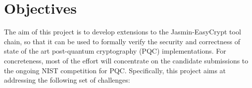 \documentclass[preprint]{iacrtrans}
\begin{document}


\section*{Objectives}

  The aim of this project is to develop extensions to the
  Jasmin-EasyCrypt tool chain, so that it can be used to formally verify
  the security and correctness of state of the art post-quantum
  cryptography (PQC) implementations. For concreteness, most of the
  effort will concentrate on the candidate submissions to the ongoing
  NIST competition for PQC. Specifically, this project aims at
  addressing the following set of challenges:
\end{document}
